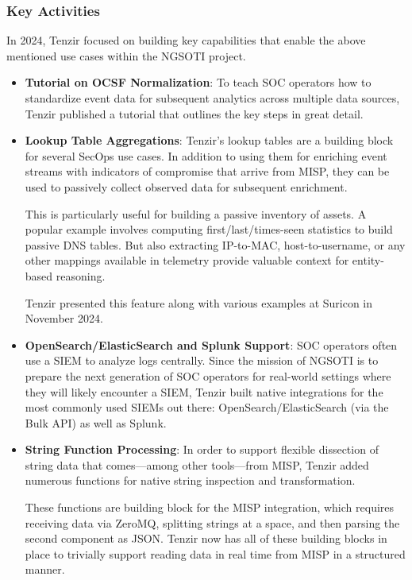 \subsubsection{Key Activities}

In 2024, Tenzir focused on building key capabilities that enable the above
mentioned use cases within the NGSOTI project.

\begin{itemize}
\item \textbf{Tutorial on OCSF Normalization}: To teach SOC operators how to
	standardize event data for subsequent analytics across multiple data
	sources, Tenzir published a tutorial that outlines the key steps in
	great
	detail\cite{tenzir_ocsf_tutorial}.

\item \textbf{Lookup Table Aggregations}: Tenzir's lookup tables are a building
	block for several SecOps use cases. In addition to using them for
	enriching event streams with indicators of compromise that arrive from
	MISP, they can be used to passively collect observed data for subsequent
	enrichment.

	This is particularly useful for building a passive inventory of assets.
	A popular example involves computing first/last/times-seen statistics to
	build passive DNS tables. But also extracting IP-to-MAC,
	host-to-username, or any other mappings available in telemetry provide
	valuable context for entity-based reasoning.

	Tenzir presented this feature along with various examples at Suricon
	in November
	2024.\cite{suricata_meets_ocsf}

\item \textbf{OpenSearch/ElasticSearch and Splunk Support}: SOC operators often
	use a SIEM to analyze logs centrally. Since the mission of NGSOTI is to
	prepare the next generation of SOC operators for real-world settings
	where they will likely encounter a SIEM, Tenzir built native
	integrations for the most commonly used SIEMs out there:
	OpenSearch/ElasticSearch (via the Bulk API) as well as Splunk.

\item \textbf{String Function Processing}: In order to support flexible
	dissection of string data that comes—among other tools—from MISP, Tenzir
	added numerous functions for native string inspection and
	transformation\cite{tenzir_tql2_string_functions}.

	These functions are building block for the MISP integration, which
	requires receiving data via ZeroMQ, splitting strings at a space, and
	then parsing the second component as JSON. Tenzir now has all of these
	building blocks in place to trivially support reading data in real time
	from MISP in a structured manner.


\end{itemize}
